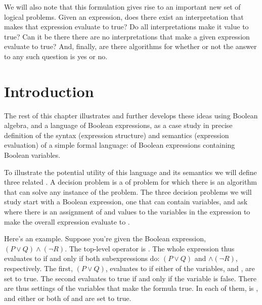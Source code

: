 \documentclass[letterpaper,10pt,english]{sphinxmanual}
\begin{document}
We will also note that this formulation gives rise to an important new
set of logical problems. Given an expression, does there exist an
interpretation that makes that expression evaluate to true? Do all
interpretations make it value to true? Can it be there there are no
interpretations that make a given expression evaluate to true?  And,
finally, are there  algorithms for  whether or
not the answer to any such question is yes or no.


\section{Introduction}
\label{\detokenize{08-propositional-logic:introduction}}
The rest of this chapter illustrates and further develops these ideas
using Boolean algebra, and a language of Boolean expressions, as a
case study in precise definition of the syntax (expression structure)
and semantics (expression evaluation) of a simple formal language: of
Boolean expressions containing Boolean variables.

To illustrate the potential utility of this language and its semantics
we will define three related . A decision problem
is a  of problem for which there is an algorithm that can solve
any instance of the problem. The three decision problems we will study
start with a Boolean expression, one that can contain variables, and
ask where there is an assignment of  and  values to the
variables in the expression to make the overall expression evaluate to
.

Here’s an example. Suppose you’re given the Boolean expression,
\((P \lor Q) \land (\lnot R)\). The top-level operator is
. The whole expression thus evaluates to  if and only if
both subexpressions do: \((P \lor Q)\) and \(\land (\lnot
R)\), respectively. The first, \((P \lor Q)\), evaluates to 
if either of the variables,  and , are set to true. The second
evaluates to true if and only if the variable  is false. There are
thus settings of the variables that make the formula true. In each of
them,  is , and either or both of  and  are set to
true.
\end{document}
